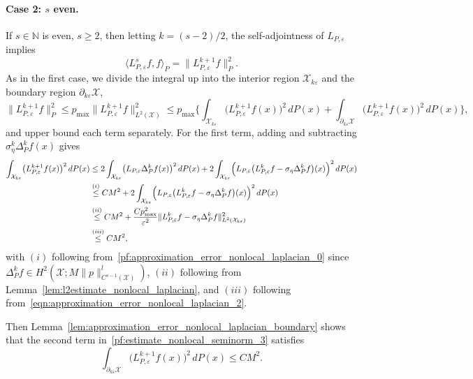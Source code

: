 \documentclass[aos]{imsart}
\theoremstyle{plain}
\theoremstyle{definition}
\theoremstyle{remark}
\newcommand{\dotp}[2]{\langle #1, #2 \rangle}
\newcommand{\mc}[1]{\mathcal{#1}}
\newcommand{\1}{\mathbf{1}}
\begin{document}
\paragraph{Case 2: $s$ even.}
If $s \in \mathbb{N}$ is even, $s \geq 2$, then letting $k = (s - 2)/2$, the  self-adjointness of $L_{P,\varepsilon}$ implies
\begin{equation*}
\dotp{L_{P,\varepsilon}^sf}{f}_P = \|L_{P,\varepsilon}^{k + 1}f\|_P^2.
\end{equation*}
As in the first case, we divide the integral up into the interior region $\mc{X}_{k\varepsilon}$ and the boundary region $\partial_{k\varepsilon}\mc{X}$,
\begin{equation}
\label{pf:estimate_nonlocal_seminorm_3}
\|L_{P,\varepsilon}^{k + 1}f\|_P^2 \leq p_{\max} \|L_{P,\varepsilon}^{k + 1}f\|_{L^2(\mc{X})}^2 \leq p_{\max}\biggl\{\int_{\mc{X}_{k\varepsilon}} \bigl(L_{P,\varepsilon}^{k + 1}f(x)\bigr)^2 \,dP(x) + \int_{\partial_{k\varepsilon}\mc{X}} \bigl(L_{P,\varepsilon}^{k + 1}f(x)\bigr)^2 \,dP(x)\biggr\},
\end{equation}
and upper bound each term separately. For the first term, adding and subtracting $\sigma_{\eta}^k \Delta_P^kf(x)$ gives
\begin{align*}
\int_{\mc{X}_{k\varepsilon}} \bigl(L_{P,\varepsilon}^{k + 1}f(x)\bigr)^2 \,dP(x) & \leq 2\int_{\mc{X}_{k\varepsilon}} \bigl(L_{P,\varepsilon}\Delta_P^kf(x)\bigr)^2 \,dP(x)  + 2 \int_{\mc{X}_{k\varepsilon}} \Bigl(L_{P,\varepsilon}\bigl(L_{P,\varepsilon}^kf- \sigma_{\eta}\Delta_P^kf\bigr)(x)\Bigr)^2 \,dP(x) \\
& \overset{(i)}{\leq} CM^2  + 2 \int_{\mc{X}_{k\varepsilon}} \Bigl(L_{P,\varepsilon}\bigl(L_{P,\varepsilon}^kf- \sigma_{\eta}\Delta_P^kf\bigr)(x)\Bigr)^2 \,dP(x) \\
& \overset{(ii)}{\leq} CM^2  + \frac{Cp_{\max}^2}{\varepsilon^{2}} \|L_{P,\varepsilon}^kf- \sigma_{\eta}\Delta_P^kf\|_{L^2(\mc{X}_{k\varepsilon})}^2 \\
& \overset{(iii)}{\leq} CM^2,
\end{align*}
with $(i)$ following from~\eqref{pf:approximation_error_nonlocal_laplacian_0} since $\Delta_P^kf \in H^2(\mc{X};M\|p\|_{C^{s - 1}(\mc{X})}^l)$, $(ii)$ following from Lemma~\ref{lem:l2estimate_nonlocal_laplacian}, and $(iii)$ following from~\eqref{eqn:approximation_error_nonlocal_laplacian_2}.

Then Lemma~\ref{lem:approximation_error_nonlocal_laplacian_boundary} shows that the second term in~\eqref{pf:estimate_nonlocal_seminorm_3} satisfies
\begin{equation*}
\int_{\partial_{k\varepsilon}\mc{X}} \bigl(L_{P,\varepsilon}^{k + 1}f(x)\bigr)^2 \,dP(x) \leq CM^2.
\end{equation*}
\end{document}
